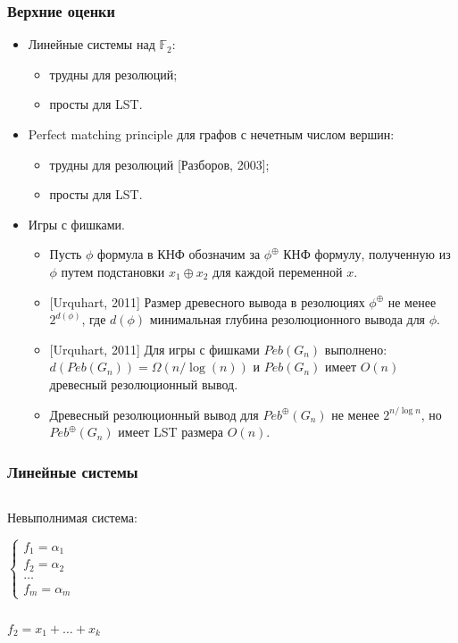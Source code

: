 \begin{frame}
    \frametitle{Верхние оценки}

    \begin{itemize}
		\item Линейные системы над $\mathbb{F}_2$:
			\begin{itemize}
				\item трудны для резолюций;
				\item просты для LST.
			\end{itemize}
        \pause
		\item Perfect matching principle для графов с нечетным числом вершин:
		    \begin{itemize}
        		\item трудны для резолюций [Разборов, 2003];
				\item просты для LST.
			\end{itemize}
        \pause
		\item Игры с фишками.
			\begin{itemize}
				\item Пусть $\phi$ формула в КНФ обозначим за $\phi^{\oplus}$ КНФ формулу, полученную из $\phi$ путем подстановки
		            $x_1 \oplus x_2$ для каждой переменной $x$. 
				\item{} [Urquhart, 2011] Размер древесного вывода в резолюциях $\phi^{\oplus}$ не менее $2^{d(\phi)}$, где
		            $d(\phi)$ минимальная глубина резолюционного вывода для  $\phi$.
				\item{} [Urquhart, 2011] Для игры с фишками $Peb(G_n)$ выполнено: $d(Peb(G_n)) = \Omega(n / \log(n))$ и $Peb(G_n)$
		            имеет $O(n)$ древесный резолюционный вывод.
				\item Древесный резолюционный вывод для $Peb^\oplus(G_n)$ не менее $2^{n / \log n}$, но $Peb^\oplus(G_n)$ имеет
		            LST размера $O(n)$. 
			\end{itemize}
	\end{itemize}
\end{frame}



\begin{frame}
    \frametitle{Линейные системы}

    \begin{columns}
		\begin{column}{1cm}
			Невыполнимая система:

			$\left\{ \begin{aligned}
				f_1 = \alpha_1 \\
				f_2 = \alpha_2 \\
				\dots\\
				f_m = \alpha_m
			\end{aligned}\right.$
		\end{column}


	\begin{column}{9cm}
			
		\end{column}
	\end{columns}

	$f_2 = x_1 + \dots + x_k$
\end{frame}




